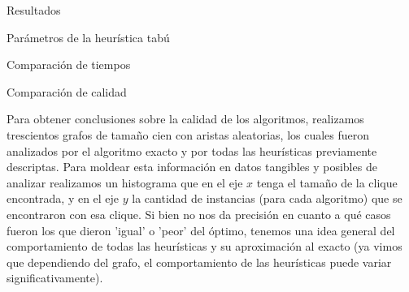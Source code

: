 \documentclass[12pt,titlepage]{article}
\begin{document}
	\newpage

	

	\newpage

	
	
	\newpage
	
	
	
	\newpage
	
	\begin{section}{Resultados}
		\begin{subsection}{Parámetros de la heurística tabú}
		\end{subsection}		

		\begin{subsection}{Comparación de tiempos}
		\end{subsection}

		\begin{subsection}{Comparación de calidad}

		Para obtener conclusiones sobre la calidad de los algoritmos, realizamos trescientos grafos de tamaño cien con aristas aleatorias, los cuales fueron analizados por el algoritmo exacto y por todas las heurísticas previamente descriptas. Para moldear esta información en datos tangibles y posibles de analizar realizamos un histograma que en el eje $x$ tenga el tamaño de la clique encontrada, y en el eje $y$ la cantidad de instancias (para cada algoritmo) que se encontraron con esa clique. Si bien no nos da precisión en cuanto a qué casos fueron los que dieron 'igual' o 'peor' del óptimo, tenemos una idea general del comportamiento de todas las heurísticas y su aproximación al exacto (ya vimos que dependiendo del grafo, el comportamiento de las heurísticas puede variar significativamente).
		

\end{subsection}
\end{section}
\end{document}
